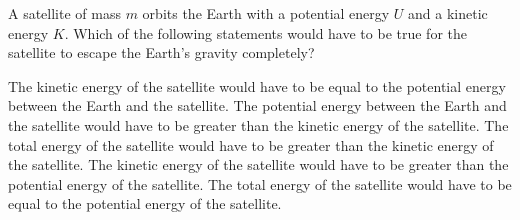 \documentclass{../../../oss-apphys-exam}
\newcounter{lastmc}
\begin{document}
\begin{questions}
  \question A satellite of mass $m$ orbits the Earth with a potential energy
  $U$ and a kinetic energy $K$. Which of the following statements would have
  to be true for the satellite to escape the Earth's gravity completely?
  \begin{choices}
    \choice The kinetic energy of the satellite would have to be equal to the
    potential energy between the Earth and the satellite.
    \choice The potential energy between the Earth and the satellite would
    have to be greater than the kinetic energy of the satellite.
    \choice The total energy of the satellite would have to be greater than
    the kinetic energy of the satellite.
    \choice The kinetic energy of the satellite would have to be greater than
    the potential energy of the satellite.
    \choice The total energy of the satellite would have to be equal to the
    potential energy of the satellite.
  \end{choices}
\end{questions}
\setcounter{lastmc}{\value{question}}
\newpage


\begin{center}
\end{center}
\end{document}
